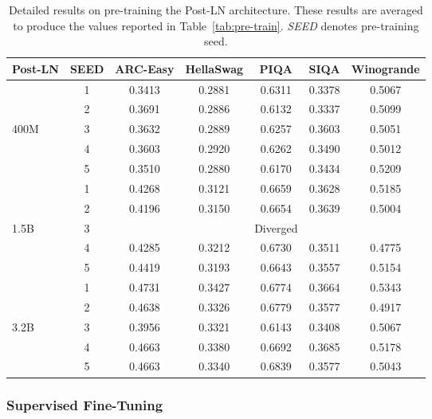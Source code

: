 \begin{table}[!ht]
\small
\vskip -0.1in
    \centering
    \caption{Detailed results on pre-training the Post-LN architecture. These results are averaged to produce the values reported in Table~\ref{tab:pre-train}. \textit{SEED} denotes pre-training seed.}
    \begin{tabular}{lcccccc}
    \toprule
        Post-LN & SEED & ARC-Easy & HellaSwag & PIQA & SIQA & Winogrande \\ 
        \toprule
        ~ & 1 & 0.3413 & 0.2881 & 0.6311 & 0.3378 & 0.5067 \\ 
        ~ & 2 & 0.3691 & 0.2886 & 0.6132 & 0.3337 & 0.5099 \\ 
        400M & 3 & 0.3632 & 0.2889 & 0.6257 & 0.3603 & 0.5051 \\ 
        ~ & 4 & 0.3603 & 0.2920 & 0.6262 & 0.3490 & 0.5012 \\ 
        ~ & 5 & 0.3510 & 0.2880 & 0.6170 & 0.3434 & 0.5209 \\ 
        \midrule
        ~& 1 & 0.4268 & 0.3121 & 0.6659 & 0.3628 & 0.5185 \\ 
        ~ & 2 & 0.4196 & 0.3150 & 0.6654 & 0.3639 & 0.5004 \\ 
        1.5B & 3 & ~ & ~ & Diverged & ~ & ~ \\ 
        ~ & 4 & 0.4285 & 0.3212 & 0.6730 & 0.3511 & 0.4775 \\ 
        ~ & 5 & 0.4419 & 0.3193 & 0.6643 & 0.3557 & 0.5154 \\ 
        \midrule
        ~ & 1 & 0.4731 & 0.3427 & 0.6774 & 0.3664 & 0.5343 \\ 
        ~ & 2 & 0.4638 & 0.3326 & 0.6779 & 0.3577 & 0.4917 \\ 
        3.2B & 3 & 0.3956 & 0.3321 & 0.6143 & 0.3408 & 0.5067 \\ 
        ~ & 4 & 0.4663 & 0.3380 & 0.6692 & 0.3685 & 0.5178 \\ 
        ~ & 5 & 0.4663 & 0.3340 & 0.6839 & 0.3577 & 0.5043 \\ 
        \bottomrule
    \end{tabular}
    \vskip -0.1in
\end{table}

\subsubsection{Supervised Fine-Tuning}


